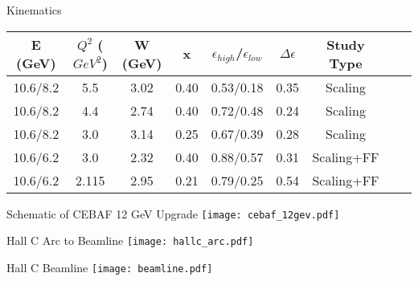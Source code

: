 \begin{Mtable}{Kinematics}
  \centering
  \begin{tabular}{|c|c|c|c|c|c|c|c|c|}
    \hline
    \textbf{E (GeV)} & \textbf{$Q^2$ ($GeV^2$)} & \textbf{W (GeV)} & \textbf{x} & \textbf{$\epsilon_{high}$/$\epsilon_{low}$} & \textbf{$\Delta\epsilon$} & \textbf{Study Type}\\
    \hline
    10.6/8.2 & 5.5 & 3.02 & 0.40 & 0.53/0.18 & 0.35 & Scaling \\
    10.6/8.2 & 4.4 & 2.74 & 0.40 & 0.72/0.48 & 0.24 & Scaling \\
    10.6/8.2 & 3.0 & 3.14 & 0.25 & 0.67/0.39 & 0.28 & Scaling \\
    10.6/6.2 & 3.0 & 2.32 & 0.40 & 0.88/0.57 & 0.31 & Scaling+FF \\
    10.6/6.2 & 2.115 & 2.95 & 0.21 & 0.79/0.25 & 0.54 & Scaling+FF \\
    \hline
    \end{tabular}
  \caption{Summary of all kinematics for the KaonLT 2018-19 experiment.}
  \label{tab:1-1_kinematics}
\end{Mtable}

%
%

\begin{Mfigure}{Schematic of CEBAF 12 GeV Upgrade}
  \centering
  \texttt{[image: cebaf\_12gev.pdf]}
  \caption{Schematic of CEBAF 12 GeV Upgrade. Hall C is circled in red.}
  \label{fig:2-1_cebaf12gev}
\end{Mfigure}

%
%

\begin{Mfigure}{Hall C Arc to Beamline}
  \centering
  \texttt{[image: hallc\_arc.pdf]}
  \caption{The Hall C arc which steers the beam to the beamline. Electron synchrotron radiation loss is shown with the yellow arrows.}
  \label{fig:2-2_hallc_arc}
\end{Mfigure}

\begin{Mfigure}{Hall C Beamline}
  \centering
  \texttt{[image: beamline.pdf]}
  \caption{Hall C beamline from entrance of hall to the target scattering chamber. [\cite{sta_jeerson_2019}]}
  \label{fig:2-2_beamline}
\end{Mfigure}

